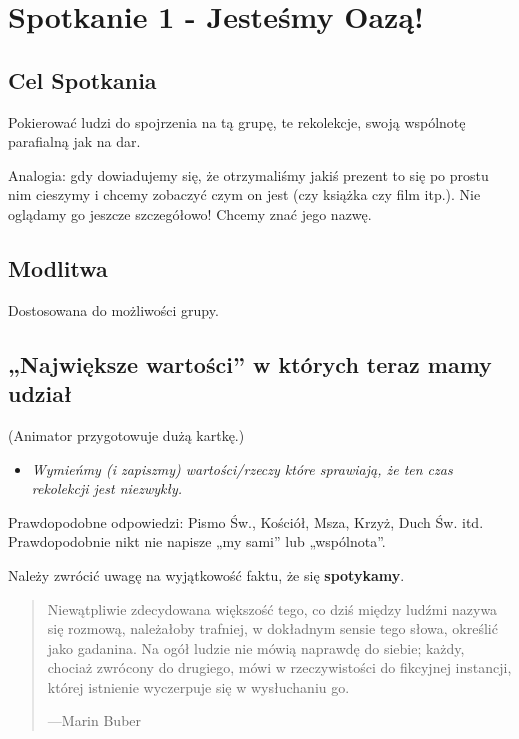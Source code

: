 \documentclass[a5paper,10pt,polish]{book}
\begin{document}
\chapter{Spotkanie 1 - Jesteśmy Oazą!}
\label{babice2006-jesien-gliwice/spotkanie1::doc}\label{babice2006-jesien-gliwice/spotkanie1:spotkanie-1-jestesmy-oaza}

\section{Cel Spotkania}
\label{babice2006-jesien-gliwice/spotkanie1:cel-spotkania}
Pokierować ludzi do spojrzenia na tą grupę, te rekolekcje, swoją wspólnotę parafialną jak na dar.

Analogia: gdy dowiadujemy się, że otrzymaliśmy jakiś prezent to się po prostu nim cieszymy i chcemy zobaczyć czym on jest (czy książka czy film itp.). Nie oglądamy go jeszcze szczegółowo! Chcemy znać jego nazwę.


\section{Modlitwa}
\label{babice2006-jesien-gliwice/spotkanie1:modlitwa}
Dostosowana do możliwości grupy.


\section{„Największe wartości” w których teraz mamy udział}
\label{babice2006-jesien-gliwice/spotkanie1:najwieksze-wartosci-w-ktorych-teraz-mamy-udzial}
(Animator przygotowuje dużą kartkę.)
\begin{itemize}
\item {} 
\emph{Wymieńmy (i zapiszmy) wartości/rzeczy które sprawiają, że ten czas rekolekcji jest niezwykły.}

\end{itemize}

Prawdopodobne odpowiedzi: Pismo Św., Kościół, Msza, Krzyż, Duch Św. itd. Prawdopodobnie nikt nie napisze „my sami” lub „wspólnota”.

Należy zwrócić uwagę na wyjątkowość faktu, że się \textbf{spotykamy}.
\begin{quote}

Niewątpliwie zdecydowana większość tego, co dziś między ludźmi nazywa się rozmową, należałoby trafniej, w dokładnym sensie tego słowa, określić jako gadanina. Na ogół ludzie nie mówią naprawdę do siebie; każdy, chociaż zwrócony do drugiego, mówi w rzeczywistości do fikcyjnej instancji, której istnienie wyczerpuje się w wysłuchaniu go.

\begin{flushright}
---Marin Buber
\end{flushright}
\end{quote}
\end{document}
